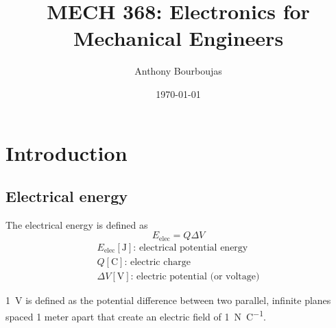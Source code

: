 \documentclass[10pt, twocolumn]{article}
\title{MECH 368: Electronics for Mechanical Engineers}
\date{\today}
\author{Anthony Bourboujas}
\begin{document}
\maketitle %
\section{Introduction}
\subsection{Electrical energy}
The electrical energy is defined as
\[
  E_\mathrm{elec} = Q \Delta V
\]
\[
  \begin{array}{|l}
    E_\mathrm{elec} [\si{\joule}] \text{: electrical potential energy} \\
    Q [\si{\coulomb}] \text{: electric charge}                         \\
    \Delta V [\si{\volt}] \text{: electric potential (or voltage)}
  \end{array}
\]

\SI{1}{\volt} is defined as the potential difference between two parallel, infinite planes spaced 1 meter apart that create an electric field of \SI{1}{\newton\per\coulomb}.
\end{document}
